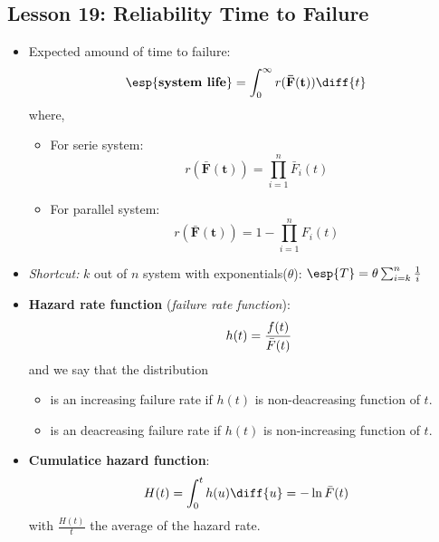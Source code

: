 \documentclass[10pt, french]{article}
\begin{document}
\begin{multicols*}{3}
\section*{Lesson 19: Reliability Time to Failure}
\begin{itemize}[align=left,leftmargin=*]
    \item Expected amound of time to failure: \[ \esp{\textbf{system life}} = \int_0^\infty r(\mathbf{\bar{F}(t)}) \diff{t} \]
    where,
    \begin{itemize}
        \item For serie system: \[ r(\mathbf{\bar{F}(t)}) = \prod_{i=1}^n \bar{F}_i(t) \]
        \item For parallel system: \[ r(\mathbf{\bar{F}(t)}) = 1 - \prod_{i=1}^n F_i(t) \]
    \end{itemize}
    \item \emph{Shortcut:} $k$ out of $n$ system with exponentials($\theta$): $\esp{T}=\theta \sum_{i=k}^n \frac{1}{i}$
    \item \textbf{Hazard rate function} (\emph{failure rate function}): \[ \hspace{.7cm} h(t) = \frac{f(t)}{\bar{F}(t)} \]
    and we say that the distribution
    \begin{itemize}
        \item is an increasing failure rate if $h(t)$ is non-deacreasing function of $t$.
        \item is an deacreasing failure rate if $h(t)$ is non-increasing function of $t$.
    \end{itemize}
    \item \textbf{Cumulatice hazard function}: \[ H(t) = \int_0^t h(u) \diff{u}= -\ln \bar{F}(t)  \] with $\frac{H(t)}{t}$ the average of the hazard rate.
\end{itemize}

\def\SectionColor{purple!80!white}

\end{multicols*}
\end{document}
